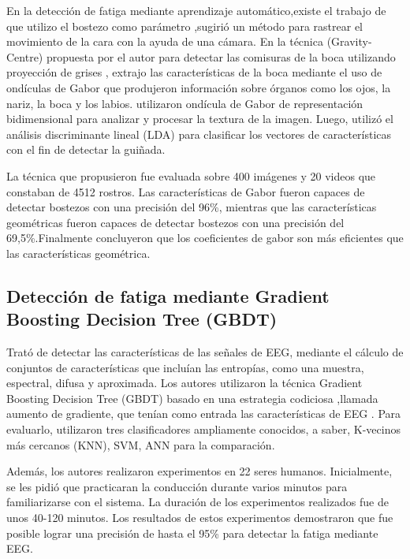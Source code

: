 En la detección  de fatiga mediante aprendizaje automático,existe el trabajo de \cite{fan2007yawning} que utilizo el bostezo como parámetro ,sugirió un método para rastrear el movimiento de la cara con la ayuda de una cámara. En la técnica   (Gravity-Centre) propuesta por el autor  para detectar las comisuras de la boca utilizando  proyección de grises , extrajo las características de la boca mediante el uso de ondículas de Gabor que produjeron información sobre órganos como los ojos, la nariz, la boca y los labios. utilizaron  ondícula de Gabor de representación bidimensional para analizar y procesar la textura de la imagen. Luego, utilizó el análisis discriminante lineal (LDA) para clasificar los vectores de características con el fin de detectar la guiñada.

La técnica que propusieron  fue evaluada sobre 400 imágenes y 20 videos que constaban de 4512 rostros. Las características de Gabor fueron capaces de detectar bostezos con una precisión del 96\%, mientras que las características geométricas fueron capaces de detectar bostezos con una precisión del 69,5\%.Finalmente concluyeron que los coeficientes de gabor son más eficientes que las características geométrica.





\subsection{Detección de fatiga mediante Gradient Boosting Decision Tree (GBDT)}


\cite{hu2018automated} Trató de detectar las características de las señales de EEG, mediante el cálculo de conjuntos de características que incluían las entropías, como una muestra, espectral, difusa y aproximada. Los autores utilizaron la técnica   Gradient Boosting Decision Tree (GBDT)  basado en una estrategia codiciosa ,llamada aumento de gradiente, que tenían como entrada las características de EEG . Para evaluarlo, utilizaron tres clasificadores ampliamente conocidos, a saber, K-vecinos más cercanos (KNN), SVM, ANN para la comparación.

Además, los autores realizaron experimentos en 22 seres humanos. Inicialmente, se les pidió que practicaran la conducción durante varios minutos para familiarizarse con el sistema. La duración de los experimentos realizados fue de unos 40-120 minutos. Los resultados de estos experimentos demostraron que fue posible lograr una precisión de hasta el 95\% para detectar la fatiga mediante EEG.



